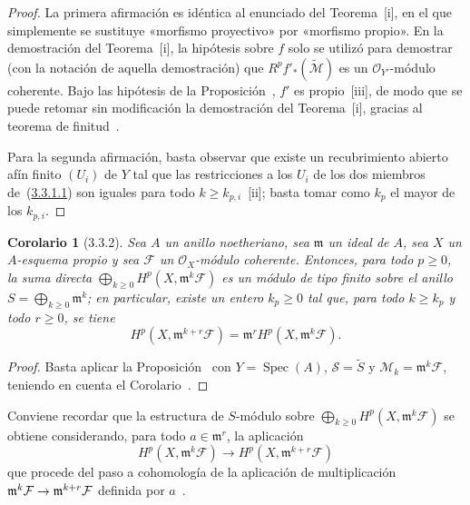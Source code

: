 \documentclass[10pt,oneside,openany]{book}
\theoremstyle{egaenv}\newtheorem*{env}{---}
\theoremstyle{egastatement}
\newtheorem*{corollary}{Corolario}
\theoremstyle{egadescription}
\renewcommand{\geq}{\geqslant}
\renewcommand{\to}{\mathchoice{\longrightarrow}{\rightarrow}{\rightarrow}{\rightarrow}}
\begin{document}
\begin{proof}
La primera afirmación es idéntica al enunciado del Teorema~[i], en el que simplemente se sustituye «morfismo proyectivo» por «morfismo propio».
En la demostración del Teorema~[i], la hipótesis sobre $f$ solo se utilizó para demostrar (con la notación de aquella demostración) que $R^pf'_*(\widetilde{\mathcal M})$ es un $\mathcal O_{Y'}$-módulo coherente.
Bajo las hipótesis de la Proposición~, $f'$ es propio~[iii], de modo que se puede retomar sin modificación la demostración del Teorema~[i], gracias al teorema de finitud~.

Para la segunda afirmación, basta observar que existe un recubrimiento abierto afín finito $(U_i)$ de $Y$ tal que las restricciones a los $U_i$ de los dos miembros de~(\hyperref[III.3.3.1.1]{3.3.1.1}) son iguales para todo $k\geq k_{p,i}$~[ii]; basta tomar como $k_p$ el mayor de los $k_{p,i}$.
\end{proof}

\begin{corollary}[3.3.2]
\label{III.3.3.2}
\label{III.3.3.2-fr}
Sea $A$ un anillo noetheriano, sea $\mathfrak m$ un ideal de $A$, sea $X$ un $A$-esquema propio y sea $\mathcal F$ un $\mathcal O_X$-módulo coherente.
Entonces, para todo $p\geq0$, la suma directa $\bigoplus_{k\geq0}H^p(X,\mathfrak m^k\mathcal F)$ es un módulo de tipo finito sobre el anillo $S=\bigoplus_{k\geq0}\mathfrak m^k$; en particular, existe un entero $k_p\geq0$ tal que, para todo $k\geq k_p$ y todo $r\geq0$, se tiene
\[
H^p(X,\mathfrak m^{k+r}\mathcal F)
=\mathfrak m^rH^p(X,\mathfrak m^k\mathcal F).
\tag{3.3.2.1}\label{III.3.3.2.1-fr}
\]
\end{corollary}

\begin{proof}
Basta aplicar la Proposición~ con $Y=\operatorname{Spec}(A)$, $\mathcal S=\widetilde S$ y $\mathcal M_k=\mathfrak m^k\mathcal F$, teniendo en cuenta el Corolario~.
\end{proof}

Conviene recordar que la estructura de $S$-módulo sobre $\bigoplus_{k\geq0}H^p(X,\mathfrak m^k\mathcal F)$ se obtiene considerando, para todo $a\in\mathfrak m^r$, la aplicación \[
H^p(X,\mathfrak m^k\mathcal F)
\longrightarrow H^p(X,\mathfrak m^{k+r}\mathcal F)
\] que procede del paso a cohomología de la aplicación de multiplicación $\mathfrak m^k\mathcal F\to\mathfrak m^{k+r}\mathcal F$ definida por $a$~.
\end{document}
